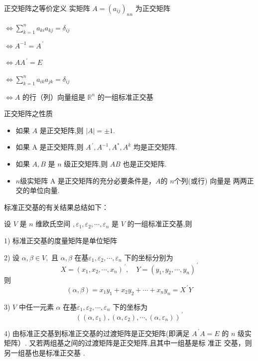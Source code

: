 \documentclass[13pt]{beamer}
\def\pf{{\bf 证明~~ }}
\def\Rn{\mathbb{R}^n}
\begin{document}
\begin{frame}{正交矩阵之等价定义}
实矩阵 $A=\left(a_{i j}\right)_{n n}$ 为正交矩阵

 $\Leftrightarrow  \sum_{k=1}^{n} a_{k i} a_{k j}=\delta_{i j} $
 
 $\Leftrightarrow A^{-1}=A^{\, \prime}$
 
$\Leftrightarrow A A^{\, \prime}=E $

$\Leftrightarrow \sum_{k=1}^{n} a_{i k} a_{j k}=\delta_{i j}$

$\Leftrightarrow A$ 的行（列）向量组是 $\Rn$ 的一组标准正交基
\end{frame}


\begin{frame}{正交矩阵之性质}
\begin{itemize}
	\item 如果 $A$ 是正交矩阵,则 $|A|=\pm 1$.
	\item 如果 A 是正交矩阵,则 $A^{\, \prime}, A^{-1}, A^{*}, A^{k}$ 均是正交矩阵.
	\item 如果 $A, B$ 是 $n$ 级正交矩阵,则 $A B$ 也是正交矩阵.
	\item $n$级实矩阵 A 是正交矩阵的充分必要条件是，$A$的 $n$个列(或行) 向量是 两两正交的单位向量.
\end{itemize}

\end{frame}

\begin{frame}
标准正交基的有关结果总结如下：

设 $V$ 是 $n$ 维欧氏空间 $, \varepsilon_{1}, \varepsilon_{2}, \cdots, \varepsilon_{n}$ 是 $V$ 的一组标准正交基,则

1) 标准正交基的度量矩阵是单位矩阵

2) 设 $\alpha, \beta \in V,$ 且 $\alpha, \beta$ 在基$\varepsilon_1, \varepsilon_{2}, \cdots, \varepsilon_{n}$ 下的坐标分别为
\[
X=\left(x_{1}, x_{2}, \cdots, x_{n}\right)^{\, \prime}, \quad Y=\left(y_{1}, y_{2}, \cdots, y_{n}\right)^{\, \prime}
\]
则
\[
(\alpha, \beta)=x_{1} y_{1}+x_{2} y_{2}+\cdots+x_{n} y_{n}=X^{\, \prime} Y
\]

3) $V$ 中任一元素 $\alpha$ 在基$\varepsilon_{1}, \varepsilon_{2}, \cdots, \varepsilon_{n}$ 下的坐标为
\[
\left(\left(\alpha, \varepsilon_{1}\right),\left(\alpha, \varepsilon_{2}\right), \cdots,\left(\alpha, \varepsilon_{n}\right)\right)^{\, \prime}
\]

4) 由标准正交基到标准正交基的过渡矩阵是正交矩阵(即满足 $A^{\, \prime} A=E$ 的
$n$ 级实矩阵）. 
又若两组基之间的过渡矩阵是正交矩阵,且其中一组基是标 准正
交基，则另一组基也是标准正交基 .
\end{frame}
\end{document}

